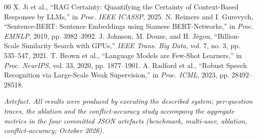 \documentclass[conference]{IEEEtran}
\begin{document}
\begin{thebibliography}{00}
 X. Ji et al., ``RAG Certainty: Quantifying the Certainty of Context-Based Responses by LLMs,'' in \emph{Proc. IEEE ICASSP}, 2025.
 N. Reimers and I. Gurevych, ``Sentence-BERT: Sentence Embeddings using Siamese BERT-Networks,'' in \emph{Proc. EMNLP}, 2019, pp. 3982--3992.
 J. Johnson, M. Douze, and H. J{\'e}gou, ``Billion-Scale Similarity Search with GPUs,'' \emph{IEEE Trans. Big Data}, vol. 7, no. 3, pp. 535--547, 2021.
 T. Brown et al., ``Language Models are Few-Shot Learners,'' in \emph{Proc. NeurIPS}, vol. 33, 2020, pp. 1877--1901.
 A. Radford et al., ``Robust Speech Recognition via Large-Scale Weak Supervision,'' in \emph{Proc. ICML}, 2023, pp. 28492--28518.
\end{thebibliography}

\vspace{6pt}
{\scriptsize\itshape Artefact. All results were produced by executing the described system; per-question traces, the ablation and the conflict-accuracy study accompany the aggregate metrics in the four committed JSON artefacts (benchmark, multi-user, ablation, conflict-accuracy; October 2026).}
\end{document}
